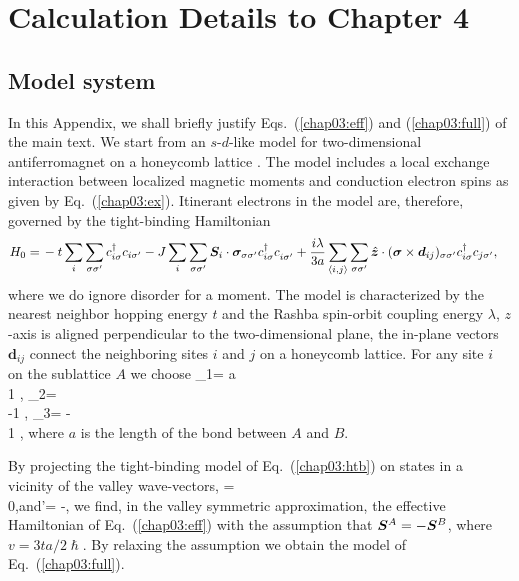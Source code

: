 \chapter{Calculation Details to Chapter 4}
\section{Model system}\label{chap03:sec:appa}

In this Appendix, we shall briefly justify Eqs.~(\ref{chap03:eff}) and (\ref{chap03:full}) of the main text. We start from an $s$-$d$-like model for two-dimensional antiferromagnet on a honeycomb lattice \cite{sumit2019}. The model includes a local exchange interaction between localized magnetic moments and conduction electron spins as given by Eq.~(\ref{chap03:ex}). Itinerant electrons in the model are, therefore, governed by the tight-binding Hamiltonian 
\begin{align}
H_0=\,&-t\sum\limits_{i}\s_{\sigma\sigma'}c_{i\sigma}^\dagger c_{i\sigma'}
-J \s_{i} \s_{\sigma\sigma'}\bb{S}_i\cdot \bb{\sigma}_{\sigma\sigma'}c^\dagger_{i\sigma}c\0_{i\sigma'}\n+\frac{i\lambda}{3a}\s_{\langle i,j\rangle}\sum\limits_{\sigma\sigma'}\hat{\bm{z}}\cdot(\bm{\sigma}\times\bm{d}_{ij})_{\sigma\sigma'}c_{i\sigma}^\dagger c_{j\sigma'},
\label{chap03:htb}
\end{align}
where we do ignore disorder for a moment. The model is characterized by the nearest neighbor hopping energy $t$ and the Rashba spin-orbit coupling energy $\lambda$, $z$-axis is aligned perpendicular to the two-dimensional plane, the in-plane vectors $\bm{d}_{ij}$ connect the neighboring sites $i$ and $j$ on a honeycomb lattice. For any site $i$ on the sublattice $A$ we choose
\be
{}_{1}= a  \\ 1 \epm, \quad {}_{2}=  \bpm {} \\ -1 \epm , \quad {}_{3}= - \bpm {}  \\ 1 \epm,
\e
where $a$ is the length of the bond between $A$ and $B$.

By projecting the tight-binding model of Eq.~(\ref{chap03:htb}) on states in a vicinity of the valley wave-vectors,
\be
{}= \\ 0\epm,\quad\mbox{and}\quad {}'= -,
\e
we find, in the valley symmetric approximation, the effective Hamiltonian of Eq.~(\ref{chap03:eff}) with the assumption that $\boldsymbol{S}^A=-\boldsymbol{S}^B$, where $v = 3ta/2\hslash$. By relaxing the assumption we obtain the model of Eq.~(\ref{chap03:full}).

